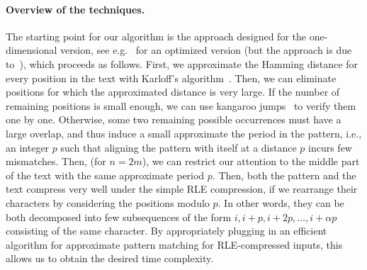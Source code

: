\documentclass[11pt, letterpaper]{article}
\theoremstyle{plain}
\theoremstyle{definition}
\theoremstyle{remark}
\begin{document}
\paragraph{Overview of the techniques.}
The starting point for our algorithm is the approach designed for the one-dimensional version, see e.g.~\cite{Gawrychowski2018}
for an optimized version (but the approach is due to~\cite{Clifford2015}), which proceeds as follows.
First, we approximate the Hamming distance for every position in the text with Karloff's algorithm~\cite{Karloff1993}.
Then, we can eliminate positions for which the approximated distance is very large.
If the number of remaining positions is small enough, we can use kangaroo jumps~\cite{Galil1986} to verify them one by one.
Otherwise, some two remaining possible occurrences must have a large overlap, and thus induce a small approximate
the period in the pattern, i.e., an integer $p$ such that aligning the pattern with itself at a distance $p$ incurs few mismatches.
Then, (for $n=2m$), we can restrict our attention to the middle part of the text with the same approximate period $p$.
Then, both the pattern and the text compress very well under the simple RLE compression, if we rearrange their characters
by considering the positions modulo $p$. In other words, they can be both decomposed into few subsequences
of the form $i, i+p, i+2p, \ldots, i+\alpha p$ consisting of the same character.
By appropriately plugging in an efficient algorithm for approximate pattern
matching for RLE-compressed inputs, this allows us to obtain the desired time complexity.
\end{document}
